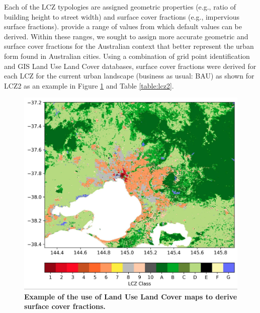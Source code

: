 \documentclass[final,3p,times,authoryear]{elsarticle}
\begin{document}
Each of the LCZ typologies are assigned geometric properties (e.g., ratio of building height to street width) and surface cover fractions (e.g., impervious surface fractions). \cite{Stewart2012b} provide a range of values from which default values can be derived. Within these ranges, we sought to assign more accurate geometric and surface cover fractions for the Australian context that better represent the urban form found in Australian cities. Using a combination of grid point identification and GIS Land Use Land Cover databases, surface cover fractions were derived for each LCZ for the current urban landscape (business as usual: BAU) as shown for LCZ2 as an example in Figure \ref{fig:surfCovFrac} and Table \ref{table:lcz2}.

\begin{figure}
\centering
\includegraphics[trim={0 0 0 0},clip,scale=0.15]{images/image5.jpg}
\caption{\bf Example of the use of Land Use Land Cover maps to derive surface cover fractions.}
 \label{fig:surfCovFrac}
\end{figure}
\end{document}
